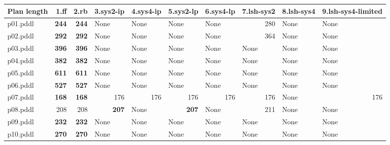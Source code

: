 \documentclass{article}
\begin{document}
\begin{tabular}{@{}lrrrrrrrrr@{}}
Plan length & 1.ff & 2.rb & 3.sys2-ip & 4.sys4-ip & 5.sys2-lp & 6.sys4-lp & 7.lsh-sys2 & 8.lsh-sys4 & 9.lsh-sys4-limited \\
\midrule
p01.pddl & \textbf{244} & \textbf{244} & \multicolumn{1}{|l|}{None} & \multicolumn{1}{|l|}{None} & \multicolumn{1}{|l|}{None} & \multicolumn{1}{|l|}{None} & 280 & \multicolumn{1}{|l|}{None} & \multicolumn{1}{|l|}{None} \\
p02.pddl & \textbf{292} & \textbf{292} & \multicolumn{1}{|l|}{None} & \multicolumn{1}{|l|}{None} & \multicolumn{1}{|l|}{None} & \multicolumn{1}{|l|}{None} & 364 & \multicolumn{1}{|l|}{None} & \multicolumn{1}{|l|}{None} \\
p03.pddl & \textbf{396} & \textbf{396} & \multicolumn{1}{|l|}{None} & \multicolumn{1}{|l|}{None} & \multicolumn{1}{|l|}{None} & \multicolumn{1}{|l|}{None} & \multicolumn{1}{|l|}{None} & \multicolumn{1}{|l|}{None} & \multicolumn{1}{|l|}{None} \\
p04.pddl & \textbf{382} & \textbf{382} & \multicolumn{1}{|l|}{None} & \multicolumn{1}{|l|}{None} & \multicolumn{1}{|l|}{None} & \multicolumn{1}{|l|}{None} & \multicolumn{1}{|l|}{None} & \multicolumn{1}{|l|}{None} & \multicolumn{1}{|l|}{None} \\
p05.pddl & \textbf{611} & \textbf{611} & \multicolumn{1}{|l|}{None} & \multicolumn{1}{|l|}{None} & \multicolumn{1}{|l|}{None} & \multicolumn{1}{|l|}{None} & \multicolumn{1}{|l|}{None} & \multicolumn{1}{|l|}{None} & \multicolumn{1}{|l|}{None} \\
p06.pddl & \textbf{527} & \textbf{527} & \multicolumn{1}{|l|}{None} & \multicolumn{1}{|l|}{None} & \multicolumn{1}{|l|}{None} & \multicolumn{1}{|l|}{None} & \multicolumn{1}{|l|}{None} & \multicolumn{1}{|l|}{None} & \multicolumn{1}{|l|}{None} \\
p07.pddl & \textbf{168} & \textbf{168} & 176 & 176 & 176 & 176 & 176 & \multicolumn{1}{|l|}{None} & 176 \\
p08.pddl & 208 & 208 & \textbf{207} & \multicolumn{1}{|l|}{None} & \textbf{207} & \multicolumn{1}{|l|}{None} & 211 & \multicolumn{1}{|l|}{None} & \multicolumn{1}{|l|}{None} \\
p09.pddl & \textbf{232} & \textbf{232} & \multicolumn{1}{|l|}{None} & \multicolumn{1}{|l|}{None} & \multicolumn{1}{|l|}{None} & \multicolumn{1}{|l|}{None} & \multicolumn{1}{|l|}{None} & \multicolumn{1}{|l|}{None} & \multicolumn{1}{|l|}{None} \\
p10.pddl & \textbf{270} & \textbf{270} & \multicolumn{1}{|l|}{None} & \multicolumn{1}{|l|}{None} & \multicolumn{1}{|l|}{None} & \multicolumn{1}{|l|}{None} & \multicolumn{1}{|l|}{None} & \multicolumn{1}{|l|}{None} & \multicolumn{1}{|l|}{None} \\

\end{tabular}
\end{document}
